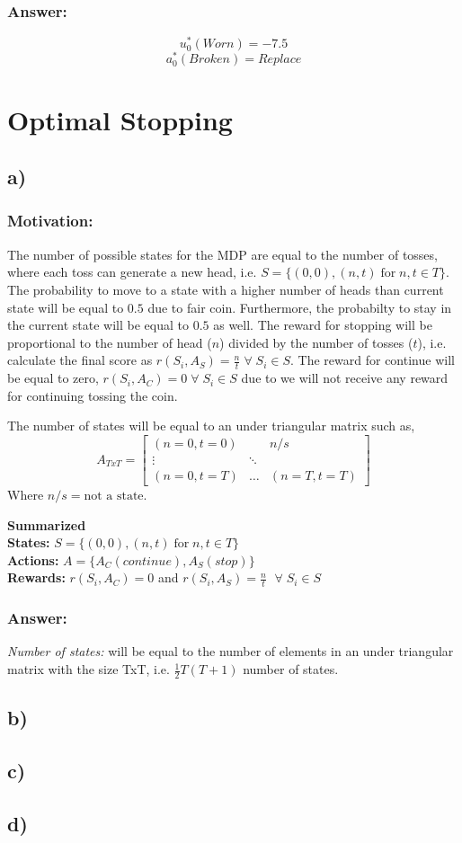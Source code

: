 \documentclass{article}
\begin{document}
\subsubsection*{Answer:}
$$u^*_0(Worn)= -7.5$$
$$a^*_0(Broken)=Replace$$


\section{Optimal Stopping}
\subsection*{a)}
\subsubsection*{Motivation:}
The number of possible states for the MDP are equal to the number of tosses, where each toss can generate a new head, i.e. $S = \{(0,0),(n, t) \; \text{for} \; n,t\in T\}$. The probability to move to a state with a higher number of heads than current state will be equal to $0.5$ due to fair coin. Furthermore, the probabilty to stay in the current state will be equal to $0.5$ as well. The reward for stopping will be proportional to the number of head ($n$) divided by the number of tosses ($t$), i.e. calculate the final score as $r(S_i, A_S) = \frac{n}{t} \; \forall \; S_i \in S$. The reward for continue will be equal to zero, $r(S_i, A_C) = 0 \; \forall \; S_i \in S $ due to we will not receive any reward for continuing tossing the coin.

The number of states will be equal to an under triangular matrix such as, 
\[
A_{Tx T} = \begin{bmatrix} 
    (n=0,t=0) &  & n/s \\
    \vdots & \ddots & \\
    (n=0, t=T) & \dots&(n=T,t=T) 
    \end{bmatrix}
\]
Where  $n/s=\text{not a state}$.

\textbf{Summarized}\\
\textbf{States:} $S = \{(0,0),(n, t) \; \text{for} \; n,t\in T\}$ \\
\textbf{Actions:} $A = \{A_C(continue), A_S(stop)\}$ \\
\textbf{Rewards:}  $r(S_i, A_C) = 0$ and $r(S_i, A_S) = \frac{n}{t}$ $ \; \forall \; S_i \in S$  \\







\subsubsection*{Answer:}
\textit{Number of states:} will be equal to the number of elements in an under triangular matrix with the size TxT, i.e. $\frac{1}{2}T(T+1)$ number of states.

\subsection*{b)}
\subsection*{c)}
\subsection*{d)}
\end{document}
